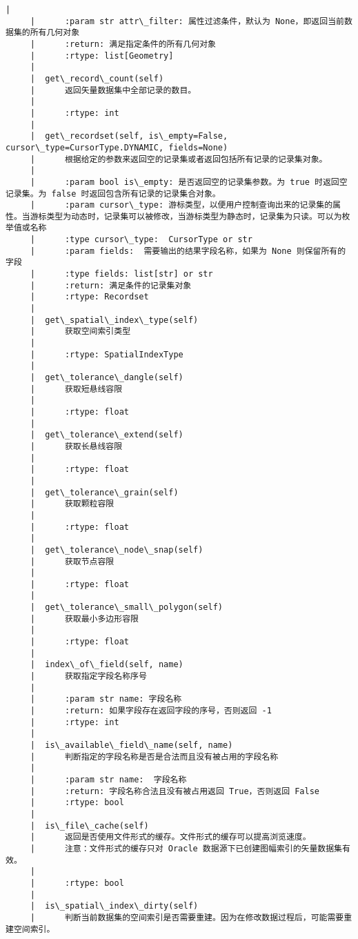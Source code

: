 \documentclass[11pt]{article}
\begin{document}
\begin{Verbatim}[commandchars=\\\{\}]
     |      
     |      :param str attr\_filter: 属性过滤条件，默认为 None，即返回当前数据集的所有几何对象
     |      :return: 满足指定条件的所有几何对象
     |      :rtype: list[Geometry]
     |  
     |  get\_record\_count(self)
     |      返回矢量数据集中全部记录的数目。
     |      
     |      :rtype: int
     |  
     |  get\_recordset(self, is\_empty=False, cursor\_type=CursorType.DYNAMIC, fields=None)
     |      根据给定的参数来返回空的记录集或者返回包括所有记录的记录集对象。
     |      
     |      :param bool is\_empty: 是否返回空的记录集参数。为 true 时返回空记录集。为 false 时返回包含所有记录的记录集合对象。
     |      :param cursor\_type: 游标类型，以便用户控制查询出来的记录集的属性。当游标类型为动态时，记录集可以被修改，当游标类型为静态时，记录集为只读。可以为枚举值或名称
     |      :type cursor\_type:  CursorType or str
     |      :param fields:  需要输出的结果字段名称，如果为 None 则保留所有的字段
     |      :type fields: list[str] or str
     |      :return: 满足条件的记录集对象
     |      :rtype: Recordset
     |  
     |  get\_spatial\_index\_type(self)
     |      获取空间索引类型
     |      
     |      :rtype: SpatialIndexType
     |  
     |  get\_tolerance\_dangle(self)
     |      获取短悬线容限
     |      
     |      :rtype: float
     |  
     |  get\_tolerance\_extend(self)
     |      获取长悬线容限
     |      
     |      :rtype: float
     |  
     |  get\_tolerance\_grain(self)
     |      获取颗粒容限
     |      
     |      :rtype: float
     |  
     |  get\_tolerance\_node\_snap(self)
     |      获取节点容限
     |      
     |      :rtype: float
     |  
     |  get\_tolerance\_small\_polygon(self)
     |      获取最小多边形容限
     |      
     |      :rtype: float
     |  
     |  index\_of\_field(self, name)
     |      获取指定字段名称序号
     |      
     |      :param str name: 字段名称
     |      :return: 如果字段存在返回字段的序号，否则返回 -1
     |      :rtype: int
     |  
     |  is\_available\_field\_name(self, name)
     |      判断指定的字段名称是否是合法而且没有被占用的字段名称
     |      
     |      :param str name:  字段名称
     |      :return: 字段名称合法且没有被占用返回 True，否则返回 False
     |      :rtype: bool
     |  
     |  is\_file\_cache(self)
     |      返回是否使用文件形式的缓存。文件形式的缓存可以提高浏览速度。
     |      注意：文件形式的缓存只对 Oracle 数据源下已创建图幅索引的矢量数据集有效。
     |      
     |      :rtype: bool
     |  
     |  is\_spatial\_index\_dirty(self)
     |      判断当前数据集的空间索引是否需要重建。因为在修改数据过程后，可能需要重建空间索引。

\end{Verbatim}
\end{document}
